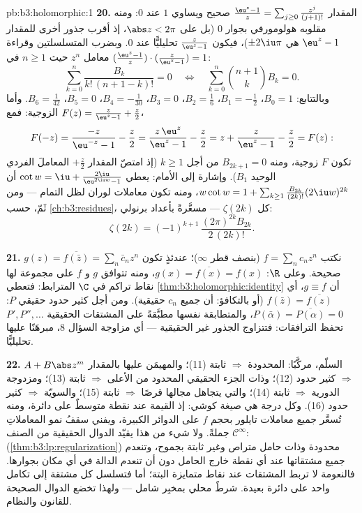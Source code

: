 \begin{solution}{pb:b3:holomorphic:1}
\textbf{20.} المقدار $\frac{\eu^z - 1}z =
\sum_{j\geq0}\frac{z^j}{(j+1)!}$ صحيح ويساوي $1$ عند $0$: ومنه
مقلوبه هولومورفي بجوار $0$ (بل على $\abs z <
2\pi$، إذ أقرب جذور أخرى
للمقدار $\eu^z - 1$ هي $\pm2\iu\pi$)، فيكون $\frac z{\eu^z-1}$ تحليليًّا
عند $0$. وبضرب المتسلسلتين وقراءة معامل $z^n$ حيث $n \geq 1$ في
$(\frac{\eu^z-1}z)\cdot(\frac
z{\eu^z-1}) = 1$:
\[
\sum_{k=0}^{n}\frac{B_k}{k!\,(n+1-k)!} = 0
\quad\Longleftrightarrow\quad
\sum_{k=0}^{n}\binom{n+1}{k}B_k = 0 .
\]
وبالتتابع: $B_0 = 1$، $B_1 = -\frac12$، $B_2 = \frac16$،
$B_3 = 0$، $B_4 = -\frac1{30}$، $B_5 = 0$، $B_6 =
\frac1{42}$. وأما الزوجية: فمع
$F(z) = \frac z{\eu^z-1} +
\frac z2$،
\[
F(-z) = \frac{-z}{\eu^{-z} - 1} - \frac z2
= \frac{z\,\eu^z}{\eu^z - 1} - \frac z2
= z + \frac{z}{\eu^z - 1} - \frac z2 = F(z) :
\]
تكون $F$ زوجية، ومنه $B_{2k+1} = 0$ من أجل $k \geq 1$ (إذ
امتصّ المقدار $+\frac z2$ المعاملَ الفردي الوحيد $B_1$). وإشارة
إلى الأمام: يعطي $\cot w = \iu + \frac{2\iu}{\eu^{2\iu w}-1}$ أن $w\cot w = 1 + \sum_{k\geq1}\frac{B_{2k}}{(2k)!}(2\iu
w)^{2k}$، ومنه تكون معاملات لوران
لظل التمام --- ومن ثَمّ، حسب \cref{ch:b3:residues}، كل $\zeta(2k)$ ---
مسعَّرةً بأعداد برنولي:
\[
\zeta(2k) = (-1)^{k+1}\,\frac{(2\pi)^{2k}B_{2k}}{2\,(2k)!} .
\]

\textbf{21.} نكتب $f = \sum_nc_nz^n$ (بنصف قطر $\infty$)؛ عندئذٍ تكون
$g(z) = \overline{f(\bar z)} = \sum_n\bar c_nz^n$ صحيحة. وعلى $\R$: $g(x) = \overline{f(x)} = f(x)$، ومنه تتوافق $g$ و $f$ على
مجموعة لها نقاط تراكم في $\C$ المترابط: فتعطي \cref{thm:b3:holomorphic:identity} أن
$g \equiv f$، أي $f(\bar z) = \overline{f(z)}$ (أو بالتكافؤ: أن جميع $c_n$ حقيقية).
ومن أجل كثير حدود حقيقي $P$: $P(\bar\alpha) = \overline{P(\alpha)} = 0$، والمتطابقة نفسها مطبَّقةً
على المشتقات الحقيقية $P', P'', \dots$ تحفظ الترافقات: فتتزاوج
الجذور غير الحقيقية --- أي مزاوجة السؤال 8، مبرهَنًا عليها
تحليليًّا.

\textbf{22.} السلّم، مركَّبًا: المحدودة $\Rightarrow$ ثابتة (11)؛
والمهيمَن عليها بالمقدار $A + B\abs z^m$ $\Rightarrow$ كثير
حدود (12)؛ وذات الجزء الحقيقي المحدود من الأعلى $\Rightarrow$
ثابتة (13)؛ ومزدوجة الدورية $\Rightarrow$ ثابتة (14)؛ والتي
يتجاهل مجالها قرصًا $\Rightarrow$ ثابتة (15)؛ والسويّة
$\Rightarrow$ كثير حدود (16). وكل درجة هي صيغة كوشي: إذ القيمة
عند نقطة متوسطٌ على دائرة، ومنه تُسعَّر جميع معاملات تايلور
بحجم $f$ على الدوائر الكبيرة، ويفني سقفُ نمو المعاملاتِ جملةً.
ولا شيء من هذا يقيّد الدوال الحقيقية من الصنف $\mathcal
C^\infty$:  (\cref{thm:b3:lp:regularization}) محدودة وذات حامل متراص وغير ثابتة بجموح،
وتنعدم جميع مشتقاتها عند أي نقطة خارج الحامل دون أن تنعدم
الدالة في أي مكان بجوارها. فالنعومة لا تربط المشتقات عند نقاط
متمايزة البتة؛ أما  فتسلسل كل مشتقة إلى تكامل واحد
على دائرة بعيدة. شرطٌ محلي بمخبِر شامل --- ولهذا تخضع الدوال
الصحيحة للقانون والنظام.


\end{solution}
